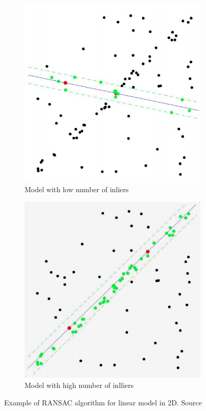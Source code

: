 \documentclass{ctuthesis}
\begin{document}
\begin{figure}[htbp]
     \centering
     \begin{subfigure}{0.475\textwidth}
         \centering
         \includegraphics[width=\textwidth]{RANSAC_bad.png}
         \caption{Model with low number of inliers}
         \label{fig:ransac-a}
     \end{subfigure}
     \hfill
     \begin{subfigure}{0.475\textwidth}
         \centering
         \includegraphics[width=\textwidth]{RANSAC_good.png}
         \caption{Model with high number of inlliers}
         \label{fig:ransac-b}
     \end{subfigure}

        \caption{Example of RANSAC algorithm for linear model in 2D. Source \cite{MPV}}
        \label{fig:ransac}
\end{figure}
\end{document}

